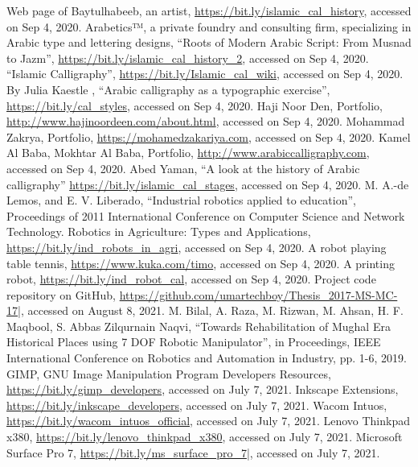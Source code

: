 \begin{thebibliography}{99}
 Web page of Baytulhabeeb, an artist, \url{https://bit.ly/islamic_cal_history}, accessed on Sep 4, 2020.
 Arabetics™, a private foundry and consulting firm, specializing in Arabic type and lettering designs, “Roots of Modern Arabic Script:  From Musnad to Jazm”, \url{https://bit.ly/islamic_cal_history_2}, accessed on Sep 4, 2020.
 “Islamic Calligraphy”, \url{https://bit.ly/Islamic_cal_wiki}, accessed on Sep 4, 2020.
 By Julia Kaestle , “Arabic calligraphy as a typographic exercise”, \url{https://bit.ly/cal_styles}, accessed on Sep 4, 2020.
 Haji Noor Den, Portfolio, \url{http://www.hajinoordeen.com/about.html}, accessed on Sep 4, 2020.
 Mohammad Zakrya, Portfolio, \url{https://mohamedzakariya.com}, accessed on Sep 4, 2020.
 Kamel Al Baba, Mokhtar Al Baba, Portfolio, \url{http://www.arabiccalligraphy.com}, accessed on Sep 4, 2020.
 Abed Yaman, “A look at the history of Arabic calligraphy” \url{https://bit.ly/islamic_cal_stages}, accessed on Sep 4, 2020.
 M. A.-de Lemos, and E. V. Liberado, “Industrial robotics applied to education”, Proceedings of 2011 International Conference on Computer Science and Network Technology.
 Robotics in Agriculture: Types and Applications, \url{https://bit.ly/ind_robots_in_agri}, accessed on Sep 4, 2020.
 A robot playing table tennis, \url{https://www.kuka.com/timo}, accessed on Sep 4, 2020.
 A printing robot, \url{https://bit.ly/ind_robot_cal}, accessed on Sep 4, 2020.
 Project code repository on GitHub, \url{https://github.com/umartechboy/Thesis_2017-MS-MC-17}|, accessed on August 8, 2021.
 M. Bilal, A. Raza, M. Rizwan, M. Ahsan, H. F. Maqbool, S. Abbas Zilqurnain Naqvi, “Towards Rehabilitation of Mughal Era Historical Places using 7 DOF Robotic Manipulator”, in Proceedings, IEEE International Conference on Robotics and Automation in Industry, pp. 1-6, 2019.
 GIMP, GNU Image Manipulation Program Developers Resources, \url{https://bit.ly/gimp_developers}, accessed on July 7, 2021.
 Inkscape Extensions, \url{https://bit.ly/inkscape_developers}, accessed on July 7, 2021.
 Wacom Intuos, \url{https://bit.ly/wacom_intuos_official}, accessed on July 7, 2021.
 Lenovo Thinkpad x380, \url{https://bit.ly/lenovo_thinkpad_x380}, accessed on July 7, 2021.
 Microsoft Surface Pro 7, \url{https://bit.ly/ms_surface_pro_7}|, accessed on July 7, 2021.

\end{thebibliography}
